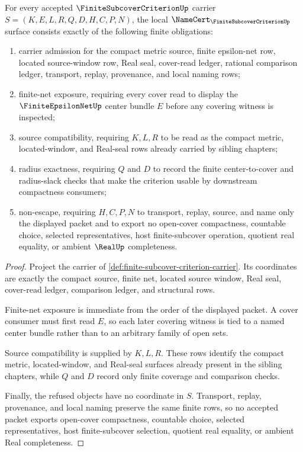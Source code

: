 \begin{theorem}
\label{thm:finite-subcover-criterion-namecert-obligations}
For every accepted $\FiniteSubcoverCriterionUp$ carrier $S=(K,E,L,R,Q,D,H,C,P,N)$, the local $\NameCert_{\FiniteSubcoverCriterionUp}$ surface consists exactly of the following finite obligations:
\begin{enumerate}
\item carrier admission for the compact metric source, finite epsilon-net row, located source-window row, Real seal, cover-read ledger, rational comparison ledger, transport, replay, provenance, and local naming rows;
\item finite-net exposure, requiring every cover read to display the $\FiniteEpsilonNetUp$ center bundle $E$ before any covering witness is inspected;
\item source compatibility, requiring $K,L,R$ to be read as the compact metric, located-window, and Real-seal rows already carried by sibling chapters;
\item radius exactness, requiring $Q$ and $D$ to record the finite center-to-cover and radius-slack checks that make the criterion usable by downstream compactness consumers;
\item non-escape, requiring $H,C,P,N$ to transport, replay, source, and name only the displayed packet and to export no open-cover compactness, countable choice, selected representatives, host finite-subcover operation, quotient real equality, or ambient $\RealUp$ completeness.
\end{enumerate}
\end{theorem}
\begin{proof}
Project the carrier of \autoref{def:finite-subcover-criterion-carrier}. Its coordinates are exactly the compact source, finite net, located source window, Real seal, cover-read ledger, comparison ledger, and structural rows.

Finite-net exposure is immediate from the order of the displayed packet. A cover consumer must first read $E$, so each later covering witness is tied to a named center bundle rather than to an arbitrary family of open sets.

Source compatibility is supplied by $K,L,R$. These rows identify the compact metric, located-window, and Real-seal surfaces already present in the sibling chapters, while $Q$ and $D$ record only finite coverage and comparison checks.

Finally, the refused objects have no coordinate in $S$. Transport, replay, provenance, and local naming preserve the same finite rows, so no accepted packet exports open-cover compactness, countable choice, selected representatives, host finite-subcover selection, quotient real equality, or ambient Real completeness.
\end{proof}

